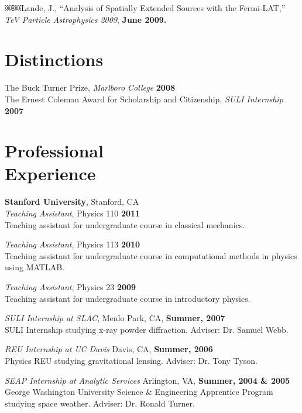 \documentclass[margin,12pt,line]{resume}
\begin{document}
\begin{resume}
￼￼Lande, J., ``Analysis of Spatially Extended Sources with the Fermi-LAT,''
      \textsl{TeV Particle Astrophysics 2009}, \hfill \textbf{June 2009.}

    \section{Distinctions}

    The Buck Turner Prize, \textsl{Marlboro College}                  \hfill \textbf{2008} \\
    The Ernest Coleman Award for Scholarship and Citizenship, \textsl{SULI Internship} \hfill \textbf{2007} \\

    \section{Professional\\Experience}

    \textbf{Stanford University}, Stanford, CA \\

    \textsl{Teaching Assistant}, Physics 110 \hfill \textbf{2011}\\
    Teaching assistant for undergraduate course in classical mechanics.

    \textsl{Teaching Assistant}, Physics 113 \hfill \textbf{2010}\\
    Teaching assistant for undergraduate course in computational
    methods in physics using MATLAB.

    \textsl{Teaching Assistant}, Physics 23 \hfill \textbf{2009}\\
    Teaching assistant for undergraduate course in introductory
    physics.

    \textsl{SULI Internship at SLAC}, Menlo Park, CA, \hfill \textbf{Summer, 2007}\\
      SULI Internship studying x-ray powder diffraction. 
      Adviser: Dr. Samuel Webb.

    \textsl{REU Internship at UC Davis} Davis, CA, \hfill \textbf{Summer, 2006}\\
        Physics REU studying gravitational lensing. Adviser: Dr. Tony Tyson.

    \textsl{SEAP Internship at Analytic Services} Arlington, VA, \hfill \textbf{Summer, 2004 \& 2005}\\
        George Washington University Science \& Engineering
        Apprentice Program studying space weather.
        Adviser: Dr. Ronald Turner.



\end{resume}
\end{document}
